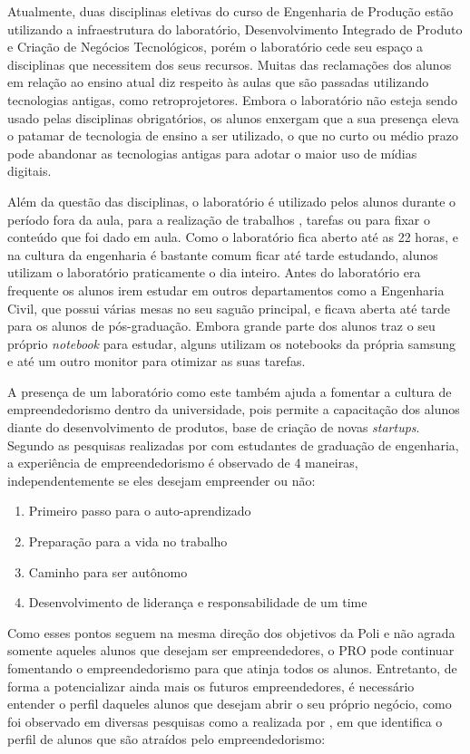 Atualmente, duas disciplinas eletivas do curso de Engenharia de Produção estão utilizando a infraestrutura do laboratório, Desenvolvimento Integrado de Produto e Criação de Negócios Tecnológicos, porém o laboratório cede seu espaço a disciplinas que necessitem dos seus recursos. Muitas das reclamações dos alunos em relação ao ensino atual diz respeito às aulas que são passadas utilizando tecnologias antigas, como retroprojetores. Embora o laboratório não esteja sendo usado pelas disciplinas obrigatórios, os alunos enxergam que a sua presença eleva o patamar de tecnologia de ensino a ser utilizado, o que no curto ou médio prazo pode abandonar as tecnologias antigas para adotar o maior uso de mídias digitais.

Além da questão das disciplinas, o laboratório é utilizado pelos alunos durante o período fora da aula, para a realização de trabalhos , tarefas ou para fixar o conteúdo que foi dado em aula. Como o laboratório fica aberto até as 22 horas, e na cultura da engenharia é bastante comum ficar até tarde estudando, alunos utilizam o laboratório praticamente o dia inteiro. Antes do laboratório era frequente os alunos irem estudar em outros departamentos como a Engenharia Civil, que possui várias mesas no seu saguão principal, e ficava aberta até tarde para os alunos de pós-graduação. Embora grande parte dos alunos traz o seu próprio \textit{notebook} para estudar, alguns utilizam os notebooks da própria samsung e até um outro monitor para otimizar as suas tarefas.

A presença de um laboratório como este também ajuda a fomentar a cultura de empreendedorismo dentro da universidade, pois permite a capacitação dos alunos diante do desenvolvimento de produtos, base de criação de novas \textit{startups}. Segundo as pesquisas realizadas por  com estudantes de graduação de engenharia, a experiência de empreendedorismo é observado de 4 maneiras, independentemente se eles desejam empreender ou não: 

\begin{enumerate}
\item Primeiro passo para o auto-aprendizado
\item Preparação para a vida no trabalho
\item Caminho para ser autônomo
\item Desenvolvimento de liderança e responsabilidade de um time
\end{enumerate}

Como esses pontos seguem na mesma direção dos objetivos da Poli e não agrada somente aqueles alunos que desejam ser empreendedores, o PRO pode continuar fomentando o empreendedorismo para que atinja todos os alunos. Entretanto, de forma a potencializar ainda mais os futuros empreendedores, é necessário entender o perfil daqueles alunos que desejam abrir o seu próprio negócio, como foi observado em diversas pesquisas como a realizada por , em que identifica o perfil de alunos que são atraídos pelo empreendedorismo:

